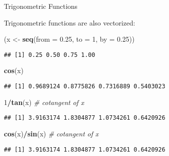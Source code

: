 \documentclass[ignorenonframetext,]{beamer}
\newenvironment{Shaded}{\begin{snugshade}}{\end{snugshade}}
\newcommand{\CommentTok}[1]{\textcolor[rgb]{0.56,0.35,0.01}{\textit{#1}}}
\newcommand{\DataTypeTok}[1]{\textcolor[rgb]{0.13,0.29,0.53}{#1}}
\newcommand{\DecValTok}[1]{\textcolor[rgb]{0.00,0.00,0.81}{#1}}
\newcommand{\FloatTok}[1]{\textcolor[rgb]{0.00,0.00,0.81}{#1}}
\newcommand{\KeywordTok}[1]{\textcolor[rgb]{0.13,0.29,0.53}{\textbf{#1}}}
\newcommand{\NormalTok}[1]{#1}
\newcommand{\OperatorTok}[1]{\textcolor[rgb]{0.81,0.36,0.00}{\textbf{#1}}}
\newcommand{\StringTok}[1]{\textcolor[rgb]{0.31,0.60,0.02}{#1}}
\begin{document}
\begin{frame}[fragile]{Trigonometric Functions}
\protect\hypertarget{trigonometric-functions-2}{}

Trigonometric functions are also vectorized:

\begin{Shaded}
\begin{Highlighting}[]
\NormalTok{(x <-}\StringTok{ }\KeywordTok{seq}\NormalTok{(}\DataTypeTok{from =} \FloatTok{0.25}\NormalTok{, }\DataTypeTok{to =} \DecValTok{1}\NormalTok{, }\DataTypeTok{by =} \FloatTok{0.25}\NormalTok{))}
\end{Highlighting}
\end{Shaded}

\begin{verbatim}
## [1] 0.25 0.50 0.75 1.00
\end{verbatim}

\begin{Shaded}
\begin{Highlighting}[]
\KeywordTok{cos}\NormalTok{(x)}
\end{Highlighting}
\end{Shaded}

\begin{verbatim}
## [1] 0.9689124 0.8775826 0.7316889 0.5403023
\end{verbatim}

\begin{Shaded}
\begin{Highlighting}[]
\DecValTok{1}\OperatorTok{/}\KeywordTok{tan}\NormalTok{(x) }\CommentTok{# cotangent of x}
\end{Highlighting}
\end{Shaded}

\begin{verbatim}
## [1] 3.9163174 1.8304877 1.0734261 0.6420926
\end{verbatim}

\begin{Shaded}
\begin{Highlighting}[]
\KeywordTok{cos}\NormalTok{(x)}\OperatorTok{/}\KeywordTok{sin}\NormalTok{(x) }\CommentTok{# cotangent of x}
\end{Highlighting}
\end{Shaded}

\begin{verbatim}
## [1] 3.9163174 1.8304877 1.0734261 0.6420926
\end{verbatim}

\end{frame}
\end{document}
